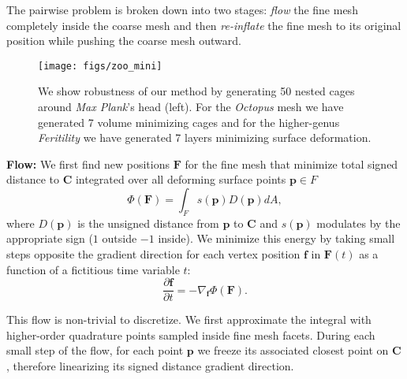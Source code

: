 \documentclass{cgyrf15}
\begin{document}
The pairwise problem is broken down into two stages: \emph{flow} the fine mesh
completely inside the coarse mesh  
and then \emph{re-inflate} the
fine mesh to its original position while pushing the coarse mesh outward.

\begin{figure*}[t]
  \texttt{[image: figs/zoo\_mini]}
  \caption{We show robustness of our method by generating 50 nested cages
  around \emph{Max Plank}'s head (left). For the \emph{Octopus} mesh we have
  generated 7 volume minimizing cages and for the higher-genus
  \emph{Feritility} we have generated 7 layers minimizing surface deformation.
  }
  \label{fig:minizoo}
\end{figure*}

\noindent \textbf{Flow:} We first find new positions $\mathbf{F}$ for the fine
mesh that minimize total signed distance to $\mathbf{C}$ integrated over all
deforming surface points $\textbf{p} \in F$ \begin{equation}
\Phi(\mathbf{F}) = \int_F s(\mathbf{p})
D(\mathbf{p}) dA, \label{eq:flow_energy} \end{equation} where
$D(\mathbf{p})$ is the unsigned distance from $\mathbf{p}$ to $\mathbf{C} $
and $s(\mathbf{p})$ modulates by the appropriate sign
($1$ outside $-1$ inside). We minimize this energy by taking small steps opposite the gradient direction
for each vertex position $\mathbf{f}$ in $\mathbf{F}(t)$
as a function of a fictitious time variable $t$:
\begin{equation}
\frac{\partial \mathbf{f}}{\partial t} = - \nabla_{\mathbf{f}} \Phi(\mathbf{F}).
\label{eq:energy_gradient}
\end{equation}


This flow is non-trivial to discretize. We first approximate the integral with
higher-order quadrature points sampled inside fine mesh facets. 
During each small step of the flow,
for each point $\textbf{p}$ we freeze its associated closest point
on $\mathbf{C}$, therefore linearizing its signed distance gradient direction. 
\end{document}
